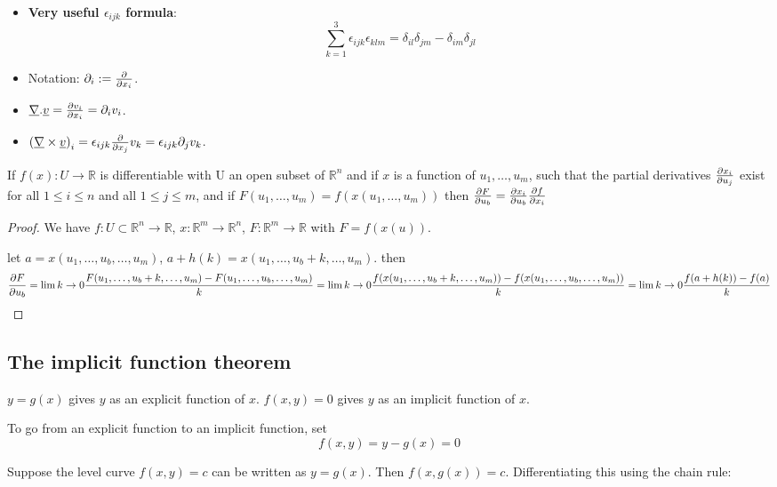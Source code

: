 \begin{itemize}
	\item \textbf{Very useful $\epsilon_{ijk}$ formula}:
	\[
		\sum_{k = 1}^{3} \epsilon_{ijk} \epsilon_{klm} = \delta_{il} \delta_{jm} - \delta_{im} \delta_{jl}
	\]
	\item Notation: $\partial_i := \diffp{}{x_i}$.
	\item $\underline{\nabla} . \underline{v} = \diffp{v_i}{x_i} = \partial_i v_i$.
	\item ${(\underline{\nabla} \times \underline{v})}_i = \epsilon_{ijk} \diffp{}{x_j} v_k = \epsilon_{ijk} \partial_j v_k$.
\end{itemize}

\begin{theorem}
	If $f(x): U \rightarrow \mathbb{R}$ is differentiable with U an open subset of $\mathbb{R}^n$ and if $x$ is a function of $u_1, \dots, u_m$, such that the partial derivatives $\diffp{x_i}{u_j}$ exist for all $1 \le i \le n$ and all $1 \le j \le m$, and if $F(u_1, \dots, u_m) = f(x(u_1, \dots, u_m))$ then $\diffp{F}{u_b} = \diffp{x_i}{u_b} \diffp{f}{x_i}$
\end{theorem}

\begin{proof}
	We have $f: U \subset \mathbb{R}^n \rightarrow \mathbb{R}$, $x: \mathbb{R}^m \rightarrow \mathbb{R}^n$, $F: \mathbb{R}^m \rightarrow \mathbb{R}$ with $F = f(x(u))$.

	let $a = x(u_1, \dots, u_b, \dots, u_m)$, $a + h(k) = x(u_1, \dots, u_b + k, \dots, u_m)$. then
	\[\diffp{F}{u_b} = \lim{k \rightarrow 0}{\frac{F(u_1, \dots, u_b + k, \dots, u_m) - F(u_1, \dots, u_b, \dots, u_m)}{k}} = \lim{k \rightarrow 0}{\frac{f(x(u_1, \dots, u_b + k, \dots, u_m)) - f(x(u_1, \dots, u_b, \dots, u_m))}{k}} = \lim{k \rightarrow 0}{\frac{f(a + h(k)) - f(a)}{k}}\]
\end{proof}

\subsection{The implicit function theorem}

$y = g(x)$ gives $y$ as an explicit function of $x$. $f(x, y) = 0$ gives $y$ as an implicit function of $x$.

To go from an explicit function to an implicit function, set \[f(x, y) = y - g(x) = 0\]

Suppose the level curve $f(x, y) = c$ can be written as $y = g(x)$. Then $f(x, g(x)) = c$. Differentiating this using the chain rule:

